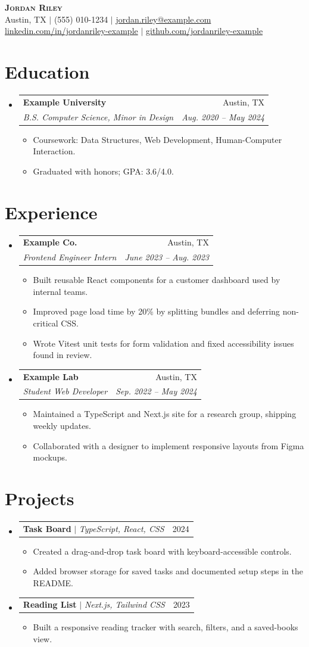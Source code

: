 \documentclass[letterpaper,11pt]{article}
\makeatletter
\newcommand{\resumeItem}[1]{
  \item\small{#1 \vspace{-2pt}}
}
\newcommand{\resumeSubheading}[4]{
  \vspace{-2pt}\item
    \begin{tabular*}{0.97\textwidth}[t]{l@{\extracolsep{\fill}}r}
      \textbf{#1} & #2 \\
      \textit{\small#3} & \textit{\small #4} \\
    \end{tabular*}\vspace{-7pt}
}
\newcommand{\resumeProjectHeading}[2]{
  \item
    \begin{tabular*}{0.97\textwidth}{l@{\extracolsep{\fill}}r}
      \small#1 & #2 \\
    \end{tabular*}\vspace{-7pt}
}
\newcommand{\resumeSubHeadingListStart}{\begin{itemize}[leftmargin=0.15in, label={}]}
\newcommand{\resumeSubHeadingListEnd}{\end{itemize}}
\newcommand{\resumeItemListStart}{\begin{itemize}}
\newcommand{\resumeItemListEnd}{\end{itemize}\vspace{-5pt}}
\makeatother
\begin{document}
\begin{center}
  \textbf{\Huge \scshape Jordan Riley} \\ \vspace{1pt}
  \small Austin, TX $|$ (555) 010-1234 $|$ \href{mailto:jordan.riley@example.com}{jordan.riley@example.com} \\
  \href{https://linkedin.com/in/jordanriley-example}{linkedin.com/in/jordanriley-example} $|$
  \href{https://github.com/jordanriley-example}{github.com/jordanriley-example}
\end{center}

\section{Education}
  \resumeSubHeadingListStart
    \resumeSubheading
      {Example University}{Austin, TX}
      {B.S. Computer Science, Minor in Design}{Aug. 2020 -- May 2024}
      \resumeItemListStart
        \resumeItem{Coursework: Data Structures, Web Development, Human-Computer Interaction.}
        \resumeItem{Graduated with honors; GPA: 3.6/4.0.}
      \resumeItemListEnd
  \resumeSubHeadingListEnd

\section{Experience}
  \resumeSubHeadingListStart
    \resumeSubheading
      {Example Co.}{Austin, TX}
      {Frontend Engineer Intern}{June 2023 -- Aug. 2023}
      \resumeItemListStart
        \resumeItem{Built reusable React components for a customer dashboard used by internal teams.}
        \resumeItem{Improved page load time by 20\% by splitting bundles and deferring non-critical CSS.}
        \resumeItem{Wrote Vitest unit tests for form validation and fixed accessibility issues found in review.}
      \resumeItemListEnd
    \resumeSubheading
      {Example Lab}{Austin, TX}
      {Student Web Developer}{Sep. 2022 -- May 2024}
      \resumeItemListStart
        \resumeItem{Maintained a TypeScript and Next.js site for a research group, shipping weekly updates.}
        \resumeItem{Collaborated with a designer to implement responsive layouts from Figma mockups.}
      \resumeItemListEnd
  \resumeSubHeadingListEnd

\section{Projects}
  \resumeSubHeadingListStart
    \resumeProjectHeading
      {\textbf{Task Board} $|$ \emph{TypeScript, React, CSS}}{2024}
      \resumeItemListStart
        \resumeItem{Created a drag-and-drop task board with keyboard-accessible controls.}
        \resumeItem{Added browser storage for saved tasks and documented setup steps in the README.}
      \resumeItemListEnd
    \resumeProjectHeading
      {\textbf{Reading List} $|$ \emph{Next.js, Tailwind CSS}}{2023}
      \resumeItemListStart
        \resumeItem{Built a responsive reading tracker with search, filters, and a saved-books view.}
      \resumeItemListEnd
  \resumeSubHeadingListEnd
\end{document}
